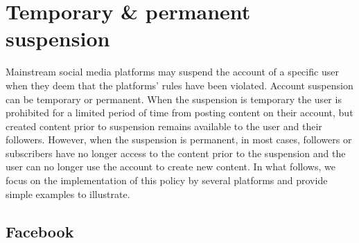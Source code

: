 \documentclass{article}
\begin{document}


\section{Temporary \& permanent suspension}

Mainstream social media platforms may suspend the account of a specific user when they deem that the platforms' rules have been violated. Account suspension can be temporary or permanent.  When the suspension is temporary the user is prohibited for a limited period of time from posting content on their account, but created content prior to suspension remains available to the user and their followers. However, when the suspension is permanent, in most cases, followers or subscribers have no longer access to the content prior to the suspension and the user can no longer use the account to create new content.  In what follows, we focus on the implementation of this policy by several platforms and provide simple examples to illustrate. 

\subsection{Facebook}
\end{document}
